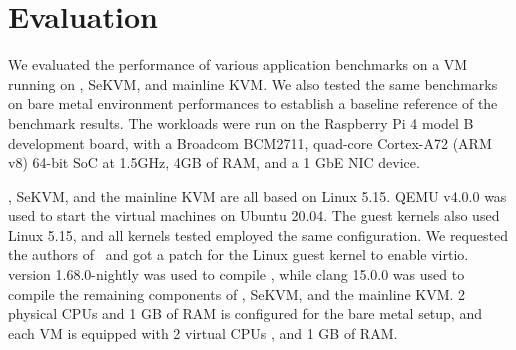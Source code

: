 \chapter{Evaluation}
\label{sec:eval}

We evaluated the performance of various application benchmarks
on a VM running on \rustsec{}, SeKVM, and mainline KVM.
We also tested the same
benchmarks on bare metal environment performances to establish a baseline
reference of the benchmark results. The workloads were run on the Raspberry
Pi 4 model B development board, with a Broadcom BCM2711, quad-core
Cortex-A72 (ARM v8) 64-bit SoC at 1.5GHz, 4GB of RAM, and a 1 GbE NIC device.

\rustsec{}, SeKVM, and the mainline KVM are all based on Linux 5.15.
QEMU v4.0.0 was used to start the virtual machines on Ubuntu 20.04. The guest
kernels also used Linux 5.15, and all kernels tested employed the same 
configuration. We requested the authors of~\cite{hypsec} and got a patch for
the Linux guest kernel to enable virtio.
 version 1.68.0-nightly was used to compile \rustcore{},
while clang 15.0.0 was used to compile the remaining components of
\rustsec{}, SeKVM, and the mainline KVM.
2 physical CPUs and 1 GB of RAM is configured for the bare
metal setup, and each VM is equipped with 2 virtual CPUs , and 1 GB of RAM.

